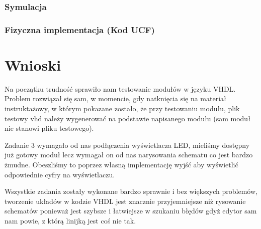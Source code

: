 \documentclass[a4paper,12pt]{extarticle}  %
\begin{document}
\subsubsection{Symulacja}
\begin{figure}[H]
   \centering
\end{figure}
\subsubsection{Fizyczna implementacja (Kod UCF)}


\section{Wnioski}

Na początku trudność sprawiło nam testowanie modułów w języku VHDL. 
Problem rozwiązał się sam, w momencie, gdy natknięcia się na materiał instruktażowy, 
w którym pokazane zostało, że przy testowaniu modułu, plik testowy vhd należy wygenerować 
na podstawie napisanego modułu (sam moduł nie stanowi pliku testowego).

Zadanie 3 wymagało od nas podłączenia wyświetlacza LED, mieliśmy dostępny już gotowy moduł lecz wymagał
on od nas narysowania schematu co jest bardzo żmudne.
Obeszliśmy to poprzez własną implementację wyjść aby wyświetlić odpowiednie cyfry na wyświetlaczu.

Wszystkie zadania zostały wykonane bardzo sprawnie i bez większych problemów, tworzenie układów w kodzie VHDL jest znacznie przyjemniejsze niż rysowanie
schematów ponieważ jest szybsze i łatwiejsze w szukaniu błędów gdyż edytor sam nam powie, z którą linijką jest coś nie tak.
\end{document}
